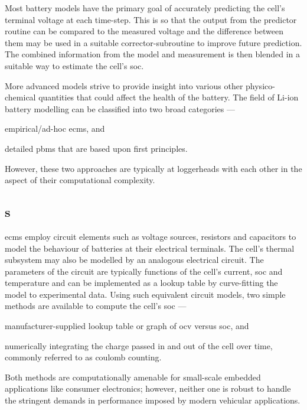 Most battery  models have the primary  goal of accurately predicting  the cell's
terminal  voltage  at each  time-step.  This  is so  that  the  output from  the
predictor routine  can be compared  to the  measured voltage and  the difference
between them  may be used in  a suitable corrector-subroutine to  improve future
prediction.  The combined  information from  the model  and measurement  is then
blended in a suitable way to estimate the cell's \gls{soc}.

More   advanced  models   strive   to  provide   insight   into  various   other
physico-chemical quantities  that could  affect the health  of the  battery. The
field of  Li-ion battery modelling can  be classified into two  broad categories
---
\begin{enumerate*}[label=\roman*)]
    \item empirical/ad-hoc \glspl{ecm}, and
    \item detailed  \glspl{pbm} that are based  upon first principles.
\end{enumerate*}
However, these  two approaches are typically  at loggerheads with each  other in
the aspect of their computational complexity.

\subsection{s}

\glspl{ecm}  employ circuit  elements  such as  voltage  sources, resistors  and
capacitors to  model the behaviour  of batteries at their  electrical terminals.
The cell's  thermal subsystem may  also be  modelled by an  analogous electrical
circuit. The  parameters of the  circuit are  typically functions of  the cell's
current, \gls{soc} and  temperature and can be implemented as  a lookup table by
curve-fitting  the model  to experimental  data. Using  such equivalent  circuit
models, two simple methods are available to compute the cell's \gls{soc} ---
\begin{enumerate*}[label=\itshape\alph*\upshape)]
    \item manufacturer-supplied  lookup table or graph of \gls{ocv} versus \gls{soc}, and
    \item numerically integrating the charge passed in and out of the cell over time, commonly referred to as coulomb counting.
\end{enumerate*}
Both methods are computationally  amenable for small-scale embedded applications
like  consumer  electronics;  however,  neither  one is  robust  to  handle  the
stringent demands in performance imposed  by modern vehicular applications.

